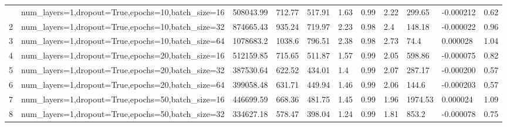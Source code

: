 \begin{longtable}{C{0.8cm} L{2cm} C{1.15cm} C{1.15cm} C{1.15cm} C{1.15cm} C{0.85cm} C{1.25cm} C{1.2cm} C{1.5cm} C{1.0cm}}
\bottomrule
{} & num\_layers=1,\newline dropout=True,\newline epochs=10,\newline batch\_size=16 & 508043.99 & 712.77 & 517.91 & 1.63 & 0.99 & 2.22 & 299.65 & -0.000212 & 0.62 \\
2 & num\_layers=1,\newline dropout=True,\newline epochs=10,\newline batch\_size=32 & 874665.43 & 935.24 & 719.97 & 2.23 & 0.98 & 2.4 & 148.18 & -0.000022 & 0.96 \\
3 & num\_layers=1,\newline dropout=True,\newline epochs=10,\newline batch\_size=64 & 1078683.2 & 1038.6 & 796.51 & 2.38 & 0.98 & 2.73 & 74.4 & 0.000028 & 1.04 \\
4 & num\_layers=1,\newline dropout=True,\newline epochs=20,\newline batch\_size=16 & 512159.85 & 715.65 & 511.87 & 1.57 & 0.99 & 2.05 & 598.86 & -0.000075 & 0.82 \\
5 & num\_layers=1,\newline dropout=True,\newline epochs=20,\newline batch\_size=32 & 387530.64 & 622.52 & 434.01 & 1.4 & 0.99 & 2.07 & 287.17 & -0.000200 & 0.57 \\
6 & num\_layers=1,\newline dropout=True,\newline epochs=20,\newline batch\_size=64 & 399058.48 & 631.71 & 449.94 & 1.46 & 0.99 & 2.06 & 144.6 & -0.000203 & 0.57 \\
7 & num\_layers=1,\newline dropout=True,\newline epochs=50,\newline batch\_size=16 & 446699.59 & 668.36 & 481.75 & 1.45 & 0.99 & 1.96 & 1974.53 & 0.000024 & 1.09 \\
8 & num\_layers=1,\newline dropout=True,\newline epochs=50,\newline batch\_size=32 & 334627.18 & 578.47 & 398.04 & 1.24 & 0.99 & 1.81 & 853.2 & -0.000078 & 0.75 \\

\end{longtable}
